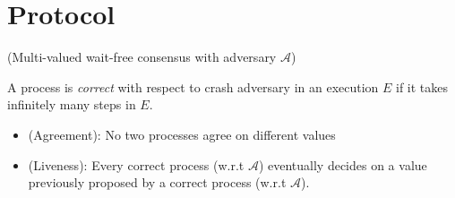 \section{Protocol}
%
\begin{definition}
(Multi-valued wait-free consensus with adversary $\mathcal{A}$)

A process is \emph{correct} with respect to crash adversary 
in an execution $E$ if it takes infinitely many steps in $E$.
%
\begin{itemize}
\item (Agreement): No two processes agree on different values  
\item (Liveness): Every correct process (w.r.t $\mathcal{A}$) 
eventually decides on a value previously proposed by a correct process (w.r.t $\mathcal{A}$).
\end{itemize}
%
\end{definition}
%

%